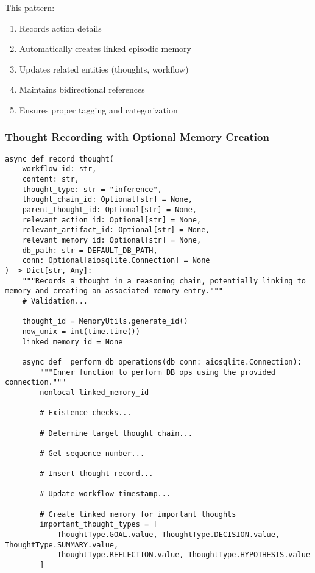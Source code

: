 \documentclass[12pt,a4paper]{article}
\begin{document}
This pattern:
\begin{enumerate}[label=\arabic*.]
    \item Records action details
    \item Automatically creates linked episodic memory
    \item Updates related entities (thoughts, workflow)
    \item Maintains bidirectional references
    \item Ensures proper tagging and categorization
\end{enumerate}

\subsubsection*{Thought Recording with Optional Memory Creation}
\begin{pageablecode}
\begin{verbatim}
async def record_thought(
    workflow_id: str,
    content: str,
    thought_type: str = "inference",
    thought_chain_id: Optional[str] = None,
    parent_thought_id: Optional[str] = None,
    relevant_action_id: Optional[str] = None,
    relevant_artifact_id: Optional[str] = None,
    relevant_memory_id: Optional[str] = None,
    db_path: str = DEFAULT_DB_PATH,
    conn: Optional[aiosqlite.Connection] = None
) -> Dict[str, Any]:
    """Records a thought in a reasoning chain, potentially linking to memory and creating an associated memory entry."""
    # Validation...

    thought_id = MemoryUtils.generate_id()
    now_unix = int(time.time())
    linked_memory_id = None

    async def _perform_db_operations(db_conn: aiosqlite.Connection):
        """Inner function to perform DB ops using the provided connection."""
        nonlocal linked_memory_id

        # Existence checks...

        # Determine target thought chain...

        # Get sequence number...

        # Insert thought record...

        # Update workflow timestamp...

        # Create linked memory for important thoughts
        important_thought_types = [
            ThoughtType.GOAL.value, ThoughtType.DECISION.value, ThoughtType.SUMMARY.value,
            ThoughtType.REFLECTION.value, ThoughtType.HYPOTHESIS.value
        ]


\end{verbatim}
\end{pageablecode}
\end{document}
